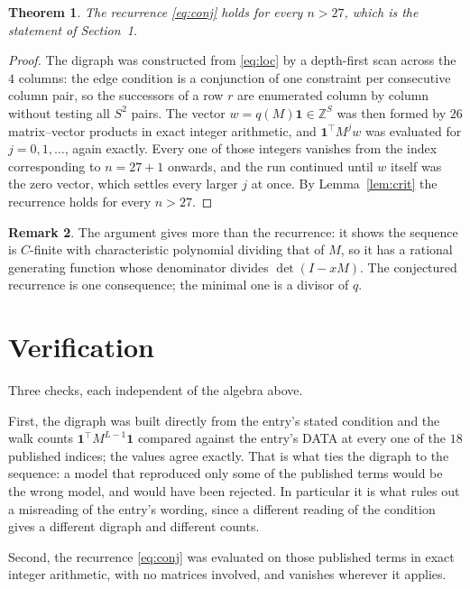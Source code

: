 \documentclass[11pt,a4paper]{article}
\theoremstyle{plain}
\newtheorem{theorem}{Theorem}
\theoremstyle{definition}
\newtheorem{remark}[theorem]{Remark}
\begin{document}
\begin{theorem}
The recurrence \eqref{eq:conj} holds for every $n>27$, which is the statement of
Section~1.
\end{theorem}

\begin{proof}
The digraph was constructed from \eqref{eq:loc} by a depth-first scan across the $4$
columns: the edge condition is a conjunction of one constraint per consecutive column
pair, so the successors of a row $r$ are enumerated column by column without testing all
$S^2$ pairs. The vector $w=q(M)\mathbf{1}\in\mathbb{Z}^{S}$ was then formed by $26$
matrix--vector products in exact integer arithmetic, and $\mathbf{1}^{\!\top}M^{j}w$ was
evaluated for $j=0,1,\dots$, again exactly. Every one of those integers vanishes from the
index corresponding to $n=27+1$ onwards, and the run continued until $w$ itself was the
zero vector, which settles every larger $j$ at once. By Lemma~\ref{lem:crit} the recurrence
holds for every $n>27$.
\end{proof}

\begin{remark}
The argument gives more than the recurrence: it shows the sequence is $C$-finite with
characteristic polynomial dividing that of $M$, so it has a rational generating function
whose denominator divides $\det(I-xM)$. The conjectured recurrence is one consequence; the
minimal one is a divisor of $q$.
\end{remark}

\section{Verification}

Three checks, each independent of the algebra above.

First, the digraph was built directly from the entry's stated condition and the walk counts
$\mathbf{1}^{\!\top}M^{L-1}\mathbf{1}$ compared against the entry's DATA at
every one of the $18$ published indices; the values agree exactly. That is what ties
the digraph to the sequence: a model that reproduced only some of the published terms would
be the wrong model, and would have been rejected. In particular it is what rules out a
misreading of the entry's wording, since a different reading of the condition gives a
different digraph and different counts.

Second, the recurrence \eqref{eq:conj} was evaluated on those published terms in exact
integer arithmetic, with no matrices involved, and vanishes wherever it applies.
\end{document}
